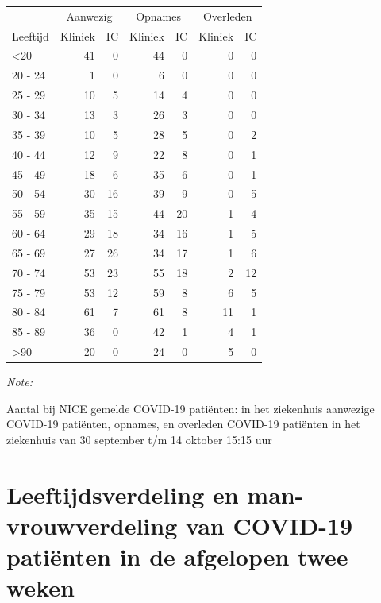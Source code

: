 \documentclass[
  english,
  man,floatsintext]{apa6}
\begin{document}
\begin{table}
\centering\begingroup\fontsize{10}{12}\selectfont

\begin{threeparttable}
\begin{tabular}{lrrrrrr}
\toprule
\multicolumn{1}{c}{ } & \multicolumn{2}{c}{Aanwezig} & \multicolumn{2}{c}{Opnames} & \multicolumn{2}{c}{Overleden} \\
\cmidrule(l{3pt}r{3pt}){2-3} \cmidrule(l{3pt}r{3pt}){4-5} \cmidrule(l{3pt}r{3pt}){6-7}
Leeftijd & Kliniek & IC & Kliniek & IC & Kliniek & IC\\
\midrule
<20 & 41 & 0 & 44 & 0 & 0 & 0\\
20 - 24 & 1 & 0 & 6 & 0 & 0 & 0\\
25 - 29 & 10 & 5 & 14 & 4 & 0 & 0\\
30 - 34 & 13 & 3 & 26 & 3 & 0 & 0\\
35 - 39 & 10 & 5 & 28 & 5 & 0 & 2\\
40 - 44 & 12 & 9 & 22 & 8 & 0 & 1\\
45 - 49 & 18 & 6 & 35 & 6 & 0 & 1\\
50 - 54 & 30 & 16 & 39 & 9 & 0 & 5\\
55 - 59 & 35 & 15 & 44 & 20 & 1 & 4\\
60 - 64 & 29 & 18 & 34 & 16 & 1 & 5\\
65 - 69 & 27 & 26 & 34 & 17 & 1 & 6\\
70 - 74 & 53 & 23 & 55 & 18 & 2 & 12\\
75 - 79 & 53 & 12 & 59 & 8 & 6 & 5\\
80 - 84 & 61 & 7 & 61 & 8 & 11 & 1\\
85 - 89 & 36 & 0 & 42 & 1 & 4 & 1\\
>90 & 20 & 0 & 24 & 0 & 5 & 0\\
\bottomrule
\end{tabular}
\begin{tablenotes}
\item \textit{Note: } 
\item Aantal bij NICE gemelde COVID-19 patiënten: in het ziekenhuis aanwezige COVID-19 patiënten, opnames, en overleden COVID-19 patiënten in het ziekenhuis van 30 september t/m 14 oktober 15:15 uur
\end{tablenotes}
\end{threeparttable}
\endgroup{}
\end{table}

\newpage

\hypertarget{leeftijdsverdeling-en-man-vrouwverdeling-van-covid-19-patiuxebnten-in-de-afgelopen-twee-weken}{%
\section{Leeftijdsverdeling en man-vrouwverdeling van COVID-19 patiënten in de afgelopen twee weken}\label{leeftijdsverdeling-en-man-vrouwverdeling-van-covid-19-patiuxebnten-in-de-afgelopen-twee-weken}}
\end{document}
